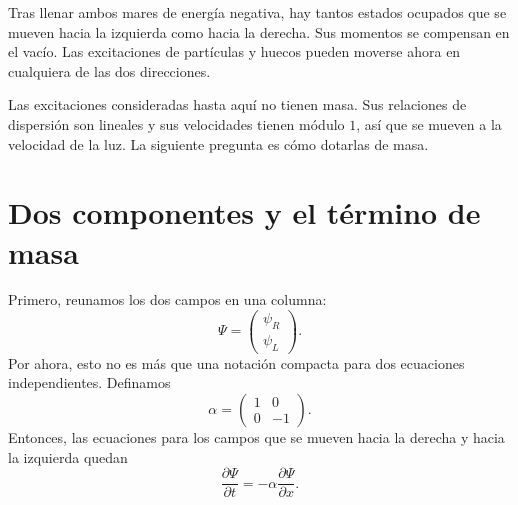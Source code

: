 Tras llenar ambos mares de energía negativa, hay tantos estados ocupados que se mueven hacia la izquierda como hacia la derecha. Sus momentos se compensan en el vacío. Las excitaciones de partículas y huecos pueden moverse ahora en cualquiera de las dos direcciones.

\begin{classroomqa}
\end{classroomqa}

Las excitaciones consideradas hasta aquí no tienen masa. Sus relaciones de dispersión son lineales y sus velocidades tienen módulo \(1\), así que se mueven a la velocidad de la luz. La siguiente pregunta es cómo dotarlas de masa.

\section{Dos componentes y el término de masa}

Primero, reunamos los dos campos en una columna:
\begin{equation}
\Psi=
\begin{pmatrix}
\psi_R\\
\psi_L
\end{pmatrix}.
\end{equation}
Por ahora, esto no es más que una notación compacta para dos ecuaciones independientes. Definamos
\begin{equation}
\alpha=
\begin{pmatrix}
1&0\\
0&-1
\end{pmatrix}.
\end{equation}
Entonces, las ecuaciones para los campos que se mueven hacia la derecha y hacia la izquierda quedan
\begin{equation}
\frac{\partial\Psi}{\partial t}
=
-\alpha\frac{\partial\Psi}{\partial x}.
\end{equation}

